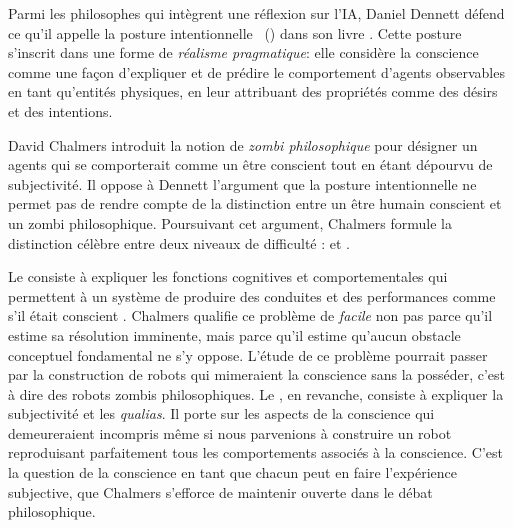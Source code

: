 \begin{quote}
	\cite{bach_california_2025}
\end{quote}

Parmi les philosophes qui intègrent une réflexion sur l'IA, Daniel Dennett défend ce qu'il appelle la \og posture intentionnelle \fg\ () dans son livre  \cite{dennett_consciousness_1991}. 
Cette posture s'inscrit dans une forme de  \textit{réalisme pragmatique}: elle considère la conscience comme une façon d'expliquer et de prédire le comportement d'agents observables en tant qu'entités physiques, en leur attribuant des propriétés comme des désirs et des intentions. 

David Chalmers introduit la notion de \emph{zombi philosophique} pour désigner un agents qui se comporterait comme un être conscient tout en étant dépourvu de subjectivité. 
Il oppose à Dennett l'argument que la posture intentionnelle ne permet pas de rendre compte de la distinction entre un être humain conscient et un zombi philosophique. 
Poursuivant cet argument, 
Chalmers formule la distinction célèbre entre deux niveaux de difficulté :  et  \cite{chalmers_conscious_1997}.

Le  consiste à expliquer les fonctions cognitives et comportementales qui permettent à un système de produire des conduites et des performances \og comme s'il était conscient \fg{}. 
Chalmers qualifie ce problème de \emph{facile} non pas parce qu'il estime sa résolution imminente,  mais parce qu'il estime qu'aucun obstacle conceptuel fondamental ne s'y oppose. 
L'étude de ce problème pourrait passer par la construction de robots qui mimeraient la conscience sans la posséder, c'est à dire des robots zombis philosophiques. 
Le , en revanche, consiste à expliquer la subjectivité et les \emph{qualias}. 
Il porte sur les aspects de la conscience qui demeureraient incompris même si nous parvenions à construire un robot reproduisant parfaitement tous les comportements associés à la conscience. 
C'est la question de la conscience en tant que chacun peut en faire l'expérience subjective, que Chalmers s'efforce de maintenir ouverte dans le débat philosophique.

